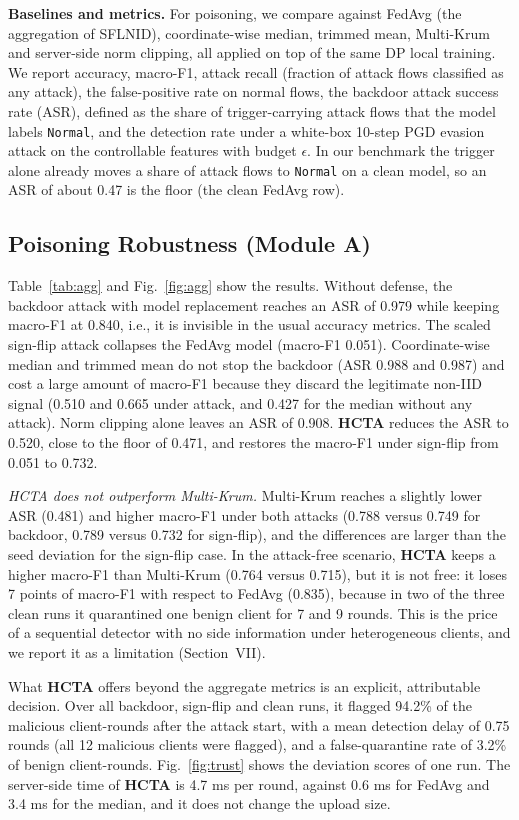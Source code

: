\documentclass[journal]{IEEEtran}
\begin{document}
\textbf{Baselines and metrics.} For poisoning, we compare against FedAvg (the aggregation of SFLNID), coordinate-wise median, trimmed mean, Multi-Krum and server-side norm clipping, all applied on top of the same DP local training. We report accuracy, macro-F1, attack recall (fraction of attack flows classified as any attack), the false-positive rate on normal flows, the backdoor attack success rate (ASR), defined as the share of trigger-carrying attack flows that the model labels \texttt{Normal}, and the detection rate under a white-box 10-step PGD evasion attack on the controllable features with budget $\epsilon$. In our benchmark the trigger alone already moves a share of attack flows to \texttt{Normal} on a clean model, so an ASR of about 0.47 is the floor (the clean FedAvg row).

\subsection{Poisoning Robustness (Module A)}
Table~\ref{tab:agg} and Fig.~\ref{fig:agg} show the results. Without defense, the backdoor attack with model replacement reaches an ASR of 0.979 while keeping macro-F1 at 0.840, i.e., it is invisible in the usual accuracy metrics. The scaled sign-flip attack collapses the FedAvg model (macro-F1 0.051). Coordinate-wise median and trimmed mean do not stop the backdoor (ASR 0.988 and 0.987) and cost a large amount of macro-F1 because they discard the legitimate non-IID signal (0.510 and 0.665 under attack, and 0.427 for the median without any attack). Norm clipping alone leaves an ASR of 0.908. \textbf{HCTA} reduces the ASR to 0.520, close to the floor of 0.471, and restores the macro-F1 under sign-flip from 0.051 to 0.732.

\emph{HCTA does not outperform Multi-Krum.} Multi-Krum reaches a slightly lower ASR (0.481) and higher macro-F1 under both attacks (0.788 versus 0.749 for backdoor, 0.789 versus 0.732 for sign-flip), and the differences are larger than the seed deviation for the sign-flip case. In the attack-free scenario, \textbf{HCTA} keeps a higher macro-F1 than Multi-Krum (0.764 versus 0.715), but it is not free: it loses 7 points of macro-F1 with respect to FedAvg (0.835), because in two of the three clean runs it quarantined one benign client for 7 and 9 rounds. This is the price of a sequential detector with no side information under heterogeneous clients, and we report it as a limitation (Section~VII).

What \textbf{HCTA} offers beyond the aggregate metrics is an explicit, attributable decision. Over all backdoor, sign-flip and clean runs, it flagged 94.2\% of the malicious client-rounds after the attack start, with a mean detection delay of 0.75 rounds (all 12 malicious clients were flagged), and a false-quarantine rate of 3.2\% of benign client-rounds. Fig.~\ref{fig:trust} shows the deviation scores of one run. The server-side time of \textbf{HCTA} is 4.7 ms per round, against 0.6 ms for FedAvg and 3.4 ms for the median, and it does not change the upload size.
\end{document}
